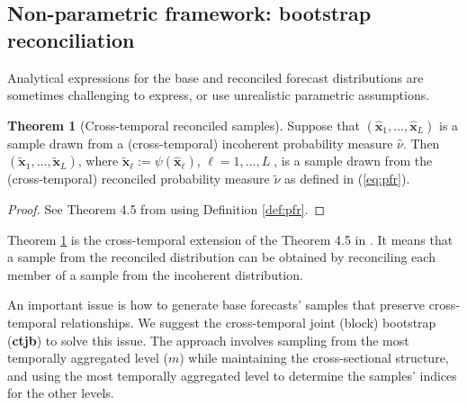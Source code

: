 \documentclass[a4paper,11pt]{article}
\newcommand{\xvet}{\bm{x}}
\theoremstyle{definition}
\newtheorem{theorem}{Theorem}[section]
\begin{document}
\subsection{Non-parametric framework: bootstrap reconciliation}\label{ssec:boot}

Analytical expressions for the base and reconciled forecast distributions are sometimes challenging to express, or use unrealistic parametric assumptions.

\begin{theorem}[Cross-temporal reconciled samples] \label{thm:rs}
	Suppose that $\left(\widehat{\xvet}_1, \ldots, \widehat{\xvet}_L\right)$ is a sample drawn from a (cross-temporal) incoherent probability measure $\widehat{\nu}$. Then $\left(\widetilde{\xvet}_1, \ldots, \widetilde{\xvet}_L\right)$, where $\widetilde{\xvet}_\ell:=\psi\left(\widehat{\xvet}_\ell\right)$, $\ell= 1, \ldots, L\;$, is a sample drawn from the (cross-temporal) reconciled probability measure $\widetilde{\nu}$ as defined in (\ref{eq:pfr}).
\end{theorem}
{\color{red}
\begin{proof}
	See Theorem 4.5 from \cite{panagiotelis2023} using Definition \ref{def:pfr}.
\end{proof}}
Theorem \ref{thm:rs} is the cross-temporal extension of the Theorem 4.5 in \cite{panagiotelis2023}. It means that a sample from the reconciled distribution can be obtained by reconciling each member of a sample from the incoherent distribution.




An important issue is how to generate base forecasts' samples that preserve cross-temporal relationships. We suggest the cross-temporal joint (block) bootstrap (\textbf{ctjb}) to solve this issue. The approach involves sampling from the most temporally aggregated level ($m$) while maintaining the cross-sectional structure, and using the most temporally aggregated level to determine the samples' indices for the other levels.
\end{document}
